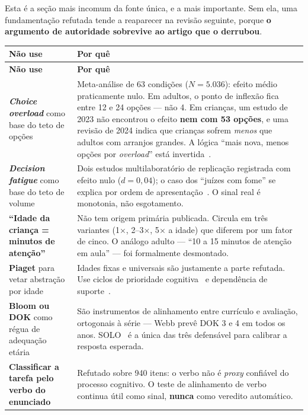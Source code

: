 \documentclass[11pt,a4paper]{article}
\begin{document}
Esta é a seção mais incomum da fonte única, e a mais importante. Sem ela, uma fundamentação refutada tende a reaparecer na revisão seguinte, porque \textbf{o argumento de autoridade sobrevive ao artigo que o derrubou}.

\begin{center}
\begin{longtable}{p{5.1cm}p{10.2cm}}
\toprule
\sffamily\bfseries\footnotesize\color{unNavy}Não use & \sffamily\bfseries\footnotesize\color{unNavy}Por quê \\
\midrule
\endfirsthead
\toprule
\sffamily\bfseries\footnotesize\color{unNavy}Não use & \sffamily\bfseries\footnotesize\color{unNavy}Por quê \\
\midrule
\endhead
\textbf{\emph{Choice overload}} como base do teto de opções &
Meta-análise de 63 condições ($N = 5.036$): efeito médio praticamente nulo. Em adultos, o ponto de inflexão fica entre 12 e 24 opções --- não 4. Em crianças, um estudo de 2023 não encontrou o efeito \textbf{nem com 53 opções}, e uma revisão de 2024 indica que crianças sofrem \emph{menos} que adultos com arranjos grandes. A lógica ``mais nova, menos opções por \emph{overload}'' está invertida~\cite{castelo2023}. \\
\addlinespace
\textbf{\emph{Decision fatigue}} como base do teto de volume &
Dois estudos multilaboratório de replicação registrada com efeito nulo ($d = 0{,}04$); o caso dos ``juízes com fome'' se explica por ordem de apresentação~\cite{hagger2016}. O sinal real é monotonia, não esgotamento. \\
\addlinespace
\textbf{``Idade da criança = minutos de atenção''} &
Não tem origem primária publicada. Circula em três variantes (1$\times$, 2--3$\times$, 5$\times$ a idade) que diferem por um fator de cinco. O análogo adulto --- ``10 a 15 minutos de atenção em aula'' --- foi formalmente desmontado. \\
\addlinespace
\textbf{Piaget} para vetar abstração por idade &
Idades fixas e universais são justamente a parte refutada. Use ciclos de prioridade cognitiva~\cite{demetriou2022} e dependência de suporte~\cite{fischer1980}. \\
\addlinespace
\textbf{Bloom ou DOK} como régua de adequação etária &
São instrumentos de alinhamento entre currículo e avaliação, ortogonais à série --- Webb prevê DOK 3 e 4 em todos os anos. SOLO~\cite{biggs1982} é a única das três defensável para calibrar a resposta esperada. \\
\addlinespace
\textbf{Classificar a tarefa pelo verbo do enunciado} &
Refutado sobre 940 itens: o verbo não é \emph{proxy} confiável do processo cognitivo. O teste de alinhamento de verbo continua útil como sinal, \textbf{nunca} como veredito automático. \\
\bottomrule
\end{longtable}
\end{center}
\end{document}
